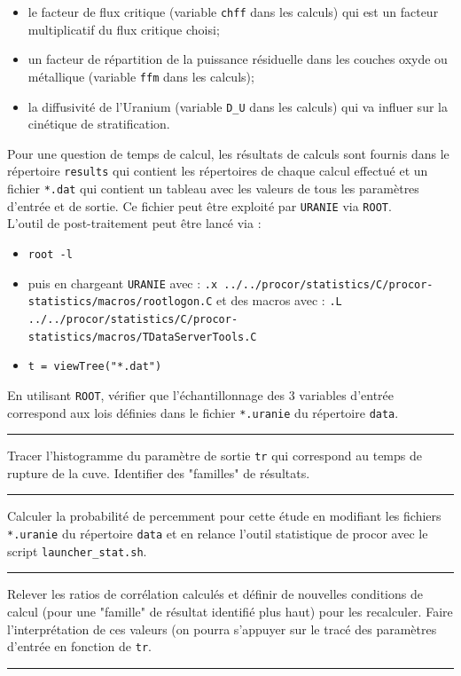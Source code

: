 \documentclass[3p]{elsarticle}
\newenvironment{remark}[1][\textit{Nota Bene}]{\begin{trivlist}
\item[\hskip \labelsep {\bfseries \rule{1ex}{1ex} #1}]\ignorespaces}{\rule{1ex}{1ex} \end{trivlist}\ignorespacesafterend}
\newcounter{question}
\newcommand{\Q}[1]{\stepcounter{question}\begin{remark}[Q\arabic{question}]#1~~\end{remark}}
\begin{document}
\begin{itemize}
	\item le facteur de flux critique (variable \texttt{chff} dans les calculs) qui est un facteur multiplicatif du flux critique choisi; 
	\item un facteur de répartition de la puissance résiduelle dans les couches oxyde ou métallique (variable \texttt{ffm} dans les calculs); 
	\item la diffusivité de l'Uranium (variable \texttt{D\_U} dans les calculs) qui va influer sur la cinétique de stratification.
\end{itemize}

Pour une question de temps de calcul, les résultats de calculs sont fournis dans le répertoire \texttt{results} qui contient les répertoires de chaque calcul effectué et un fichier \texttt{*.dat} qui contient un tableau avec les valeurs de tous les paramètres d'entrée et de sortie. Ce fichier peut être exploité par \texttt{URANIE} via \texttt{ROOT}.\\

L'outil de post-traitement peut être lancé via :
\begin{itemize}
    \item \texttt{root -l}
    \item puis en chargeant \texttt{URANIE} avec : \texttt{.x ../../procor/statistics/C/procor-statistics/macros/rootlogon.C} et des macros avec : \texttt{.L ../../procor/statistics/C/procor-statistics/macros/TDataServerTools.C}
    \item \texttt{t = viewTree("*.dat")}
\end{itemize}


\Q{En utilisant \texttt{ROOT}, vérifier que l'échantillonnage des 3 variables d'entrée correspond aux lois définies dans le fichier \texttt{*.uranie} du répertoire \texttt{data}.}

\Q{Tracer l'histogramme du paramètre de sortie \texttt{tr} qui correspond au temps de rupture de la cuve. Identifier des "familles" de résultats.}

\Q{Calculer la probabilité de percemment pour cette étude en modifiant les fichiers \texttt{*.uranie} du répertoire \texttt{data} et en relance l'outil statistique de procor avec le script \texttt{launcher\_stat.sh}.}

\Q{Relever les ratios de corrélation calculés et définir de nouvelles conditions de calcul (pour une "famille" de résultat identifié plus haut) pour les recalculer. Faire l'interprétation de ces valeurs (on pourra s'appuyer sur le tracé des paramètres d'entrée en fonction de \texttt{tr}.}
\end{document}
